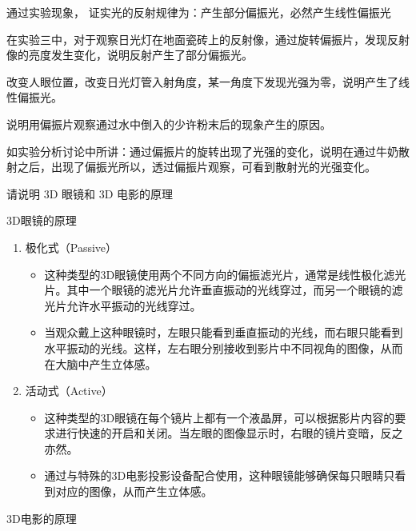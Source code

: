 \documentclass[dvipsnames, svgnames,a4paper,11pt]{article}
\begin{document}
	\begin{question}
		通过实验现象， 证实光的反射规律为：产生部分偏振光，必然产生线性偏振光
	\end{question}
	在实验三中，对于观察日光灯在地面瓷砖上的反射像，通过旋转偏振片，发现反射像的亮度发生变化，说明反射产生了部分偏振光。

改变人眼位置，改变日光灯管入射角度，某一角度下发现光强为零，说明产生了线性偏振光。
	\begin{question}
		说明用偏振片观察通过水中倒入的少许粉末后的现象产生的原因。
	\end{question}
	如实验分析讨论中所讲：通过偏振片的旋转出现了光强的变化，说明在通过牛奶散射之后，出现了偏振光所以，透过偏振片观察，可看到散射光的光强变化。
	\begin{question}
		请说明 3D 眼镜和 3D 电影的原理
	\end{question}
3D眼镜的原理
	\begin{enumerate}
\item 极化式（Passive）
\begin{itemize}
  \item 这种类型的3D眼镜使用两个不同方向的偏振滤光片，通常是线性极化滤光片。其中一个眼镜的滤光片允许垂直振动的光线穿过，而另一个眼镜的滤光片允许水平振动的光线穿过。
  \item 当观众戴上这种眼镜时，左眼只能看到垂直振动的光线，而右眼只能看到水平振动的光线。这样，左右眼分别接收到影片中不同视角的图像，从而在大脑中产生立体感。
\end{itemize}

\item 活动式（Active）
\begin{itemize}
  \item 这种类型的3D眼镜在每个镜片上都有一个液晶屏，可以根据影片内容的要求进行快速的开启和关闭。当左眼的图像显示时，右眼的镜片变暗，反之亦然。
  \item 通过与特殊的3D电影投影设备配合使用，这种眼镜能够确保每只眼睛只看到对应的图像，从而产生立体感。
\end{itemize}
\end{enumerate}
3D电影的原理
\end{document}
